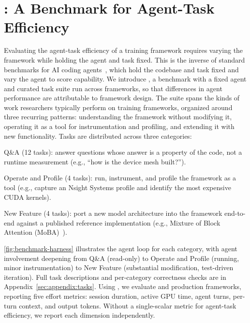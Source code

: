 \section{\sysbench: A Benchmark for Agent-Task Efficiency}
\label{sec:benchmark}




Evaluating the agent-task efficiency of a training framework requires
varying the framework while holding the agent and task fixed. This is
the inverse of standard benchmarks for AI coding agents~\cite{jimenez2024swebench,chen2021evaluatinglargelanguagemodels,austin2021programsynthesislargelanguage},
which hold the codebase and task fixed and vary the agent to score
capability. We introduce \sysbench,
a benchmark with a fixed agent and curated task suite run across
frameworks, so that differences in agent performance are
attributable to framework design. The suite spans the kinds of work
researchers typically perform on training frameworks, organized
around three recurring patterns: understanding the framework
without modifying it, operating it as a tool for instrumentation
and profiling, and extending it with new functionality. Tasks are distributed across three categories:
\squishlist
  \vspace{-3pt}
  \item Q\&A (12 tasks): answer questions whose answer is a
  property of the code, not a runtime measurement (e.g., ``how is
  the device mesh built?'').
  \vspace{-3pt}
  \item Operate and Profile (4 tasks): run, instrument, and
  profile the framework as a tool (e.g., capture an Nsight Systems
  profile and identify the most expensive CUDA kernels).
  \vspace{-3pt}
  \item New Feature (4 tasks): port a new model architecture into
  the framework end-to-end against a published reference
  implementation (e.g., Mixture of Block Attention
  (MoBA)~\cite{lu2025moba}).
  \vspace{-3pt}
\squishend


\autoref{fig:benchmark-harness} illustrates the agent loop for each
category, with agent involvement deepening from Q\&A (read-only)
to Operate and Profile (running, minor instrumentation) to New
Feature (substantial modification, test-driven iteration). Full
task descriptions and per-category correctness checks are in
Appendix~\ref{sec:appendix:tasks}. Using \sysbench, we evaluate
\sys and production frameworks, reporting five effort metrics:
session duration, active GPU time, agent turns, per-turn context,
and output tokens. Without a single-scalar metric for agent-task
efficiency, we report each dimension independently.

